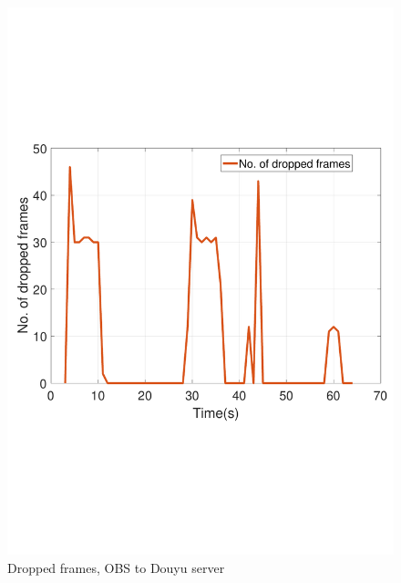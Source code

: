 \begin{figure}[htb]
  \includegraphics[width=\linewidth]{fig/obs_douyu_drop.pdf}
  \caption{Dropped frames, OBS to Douyu server}
  \label{fig:obs-douyu-drop}
\endminipage\hfill
{}

\end{figure}

